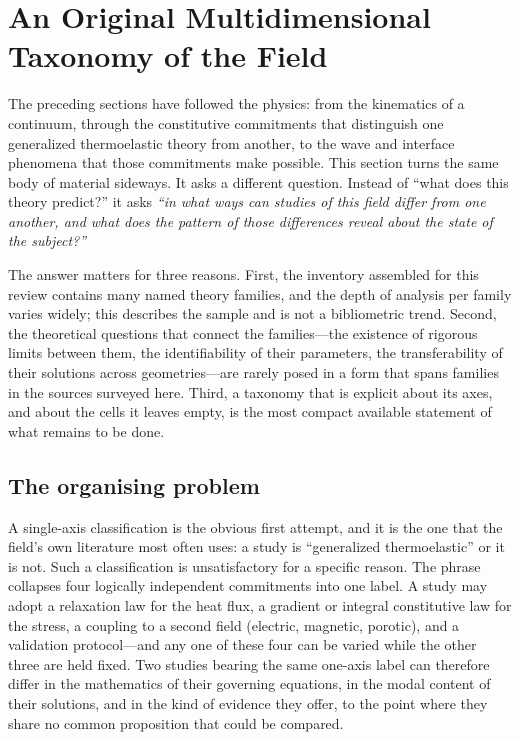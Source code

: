 \section{An Original Multidimensional Taxonomy of the Field}
\label{sec:taxonomy}

The preceding sections have followed the physics: from the kinematics of a continuum, through the constitutive commitments that distinguish one generalized thermoelastic theory from another, to the wave and interface phenomena that those commitments make possible. This section turns the same body of material sideways. It asks a different question. Instead of ``what does this theory predict?'' it asks \emph{``in what ways can studies of this field differ from one another, and what does the pattern of those differences reveal about the state of the subject?''}

The answer matters for three reasons. First, the inventory assembled for this review contains many named theory families, and the depth of analysis per family varies widely; this describes the sample and is not a bibliometric trend. Second, the theoretical questions that connect the families---the existence of rigorous limits between them, the identifiability of their parameters, the transferability of their solutions across geometries---are rarely posed in a form that spans families in the sources surveyed here. Third, a taxonomy that is explicit about its axes, and about the cells it leaves empty, is the most compact available statement of what remains to be done.

\subsection{The organising problem}
\label{sec:14.1}

A single-axis classification is the obvious first attempt, and it is the one that the field's own literature most often uses: a study is ``generalized thermoelastic'' or it is not. Such a classification is unsatisfactory for a specific reason. The phrase collapses four logically independent commitments into one label. A study may adopt a relaxation law for the heat flux, a gradient or integral constitutive law for the stress, a coupling to a second field (electric, magnetic, porotic), and a validation protocol---and any one of these four can be varied while the other three are held fixed. Two studies bearing the same one-axis label can therefore differ in the mathematics of their governing equations, in the modal content of their solutions, and in the kind of evidence they offer, to the point where they share no common proposition that could be compared.

